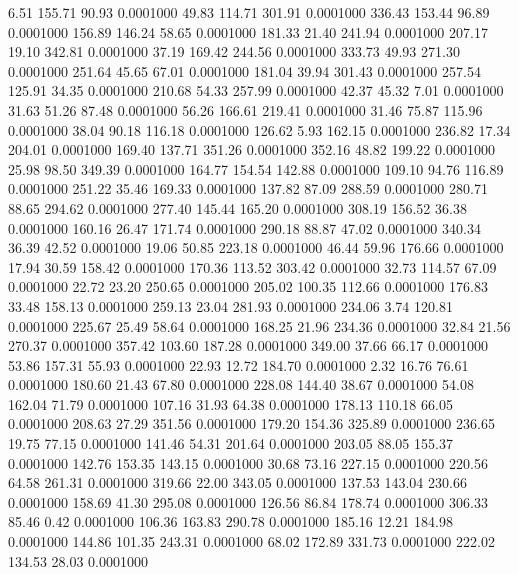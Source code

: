    6.51  155.71   90.93   0.0001000
  49.83  114.71  301.91   0.0001000
 336.43  153.44   96.89   0.0001000
 156.89  146.24   58.65   0.0001000
 181.33   21.40  241.94   0.0001000
 207.17   19.10  342.81   0.0001000
  37.19  169.42  244.56   0.0001000
 333.73   49.93  271.30   0.0001000
 251.64   45.65   67.01   0.0001000
 181.04   39.94  301.43   0.0001000
 257.54  125.91   34.35   0.0001000
 210.68   54.33  257.99   0.0001000
  42.37   45.32    7.01   0.0001000
  31.63   51.26   87.48   0.0001000
  56.26  166.61  219.41   0.0001000
  31.46   75.87  115.96   0.0001000
  38.04   90.18  116.18   0.0001000
 126.62    5.93  162.15   0.0001000
 236.82   17.34  204.01   0.0001000
 169.40  137.71  351.26   0.0001000
 352.16   48.82  199.22   0.0001000
  25.98   98.50  349.39   0.0001000
 164.77  154.54  142.88   0.0001000
 109.10   94.76  116.89   0.0001000
 251.22   35.46  169.33   0.0001000
 137.82   87.09  288.59   0.0001000
 280.71   88.65  294.62   0.0001000
 277.40  145.44  165.20   0.0001000
 308.19  156.52   36.38   0.0001000
 160.16   26.47  171.74   0.0001000
 290.18   88.87   47.02   0.0001000
 340.34   36.39   42.52   0.0001000
  19.06   50.85  223.18   0.0001000
  46.44   59.96  176.66   0.0001000
  17.94   30.59  158.42   0.0001000
 170.36  113.52  303.42   0.0001000
  32.73  114.57   67.09   0.0001000
  22.72   23.20  250.65   0.0001000
 205.02  100.35  112.66   0.0001000
 176.83   33.48  158.13   0.0001000
 259.13   23.04  281.93   0.0001000
 234.06    3.74  120.81   0.0001000
 225.67   25.49   58.64   0.0001000
 168.25   21.96  234.36   0.0001000
  32.84   21.56  270.37   0.0001000
 357.42  103.60  187.28   0.0001000
 349.00   37.66   66.17   0.0001000
  53.86  157.31   55.93   0.0001000
  22.93   12.72  184.70   0.0001000
   2.32   16.76   76.61   0.0001000
 180.60   21.43   67.80   0.0001000
 228.08  144.40   38.67   0.0001000
  54.08  162.04   71.79   0.0001000
 107.16   31.93   64.38   0.0001000
 178.13  110.18   66.05   0.0001000
 208.63   27.29  351.56   0.0001000
 179.20  154.36  325.89   0.0001000
 236.65   19.75   77.15   0.0001000
 141.46   54.31  201.64   0.0001000
 203.05   88.05  155.37   0.0001000
 142.76  153.35  143.15   0.0001000
  30.68   73.16  227.15   0.0001000
 220.56   64.58  261.31   0.0001000
 319.66   22.00  343.05   0.0001000
 137.53  143.04  230.66   0.0001000
 158.69   41.30  295.08   0.0001000
 126.56   86.84  178.74   0.0001000
 306.33   85.46    0.42   0.0001000
 106.36  163.83  290.78   0.0001000
 185.16   12.21  184.98   0.0001000
 144.86  101.35  243.31   0.0001000
  68.02  172.89  331.73   0.0001000
 222.02  134.53   28.03   0.0001000
